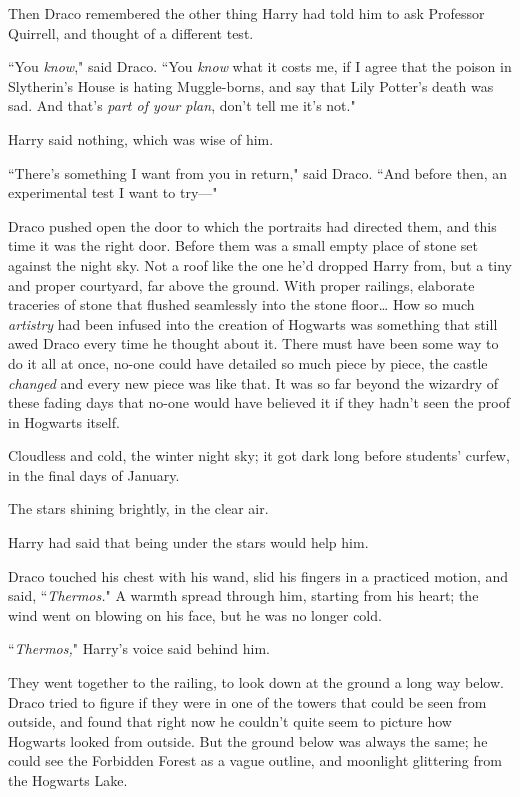 Then Draco remembered the other thing Harry had told him to ask Professor Quirrell, and thought of a different test.

``You \emph{know}," said Draco. ``You \emph{know} what it costs me, if I agree that the poison in Slytherin's House is hating Muggle-borns, and say that Lily Potter's death was sad. And that's \emph{part of your plan}, don't tell me it's not."

Harry said nothing, which was wise of him.

``There's something I want from you in return," said Draco. ``And before then, an experimental test I want to try—"

\later

Draco pushed open the door to which the portraits had directed them, and this time it was the right door. Before them was a small empty place of stone set against the night sky. Not a roof like the one he'd dropped Harry from, but a tiny and proper courtyard, far above the ground. With proper railings, elaborate traceries of stone that flushed seamlessly into the stone floor{\ldots} How so much \emph{artistry} had been infused into the creation of Hogwarts was something that still awed Draco every time he thought about it. There must have been some way to do it all at once, no-one could have detailed so much piece by piece, the castle \emph{changed} and every new piece was like that. It was so far beyond the wizardry of these fading days that no-one would have believed it if they hadn't seen the proof in Hogwarts itself.

Cloudless and cold, the winter night sky; it got dark long before students' curfew, in the final days of January.

The stars shining brightly, in the clear air.

Harry had said that being under the stars would help him.

Draco touched his chest with his wand, slid his fingers in a practiced motion, and said, ``\emph{Thermos.}" A warmth spread through him, starting from his heart; the wind went on blowing on his face, but he was no longer cold.

``\emph{Thermos,}" Harry's voice said behind him.

They went together to the railing, to look down at the ground a long way below. Draco tried to figure if they were in one of the towers that could be seen from outside, and found that right now he couldn't quite seem to picture how Hogwarts looked from outside. But the ground below was always the same; he could see the Forbidden Forest as a vague outline, and moonlight glittering from the Hogwarts Lake.

